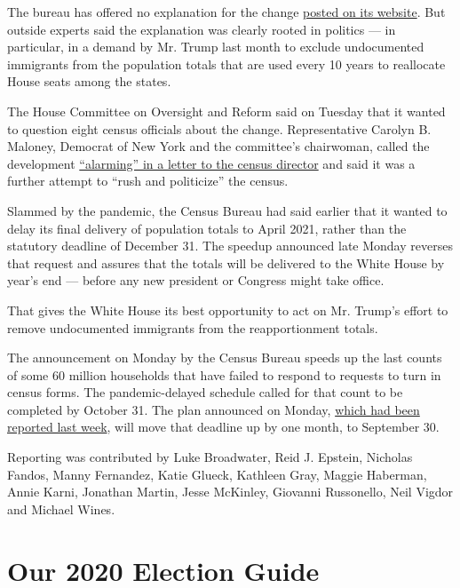The bureau has offered no explanation for the change
\href{https://www.census.gov/newsroom/press-releases/2020/delivering-complete-accurate-count.html}{posted
on its website}. But outside experts said the explanation was clearly
rooted in politics --- in particular, in a demand by Mr. Trump last
month to exclude undocumented immigrants from the population totals that
are used every 10 years to reallocate House seats among the states.

The House Committee on Oversight and Reform said on Tuesday that it
wanted to question eight census officials about the change.
Representative Carolyn B. Maloney, Democrat of New York and the
committee's chairwoman, called the development
\href{https://oversight.house.gov/sites/democrats.oversight.house.gov/files/2020-08-04.CBM\%20to\%20Dillingham\%20re\%20Transcribed\%20Interviews.pdf}{``alarming''
in a letter to the census director} and said it was a further attempt to
``rush and politicize'' the census.

Slammed by the pandemic, the Census Bureau had said earlier that it
wanted to delay its final delivery of population totals to April 2021,
rather than the statutory deadline of December 31. The speedup announced
late Monday reverses that request and assures that the totals will be
delivered to the White House by year's end --- before any new president
or Congress might take office.

That gives the White House its best opportunity to act on Mr. Trump's
effort to remove undocumented immigrants from the reapportionment
totals.

The announcement on Monday by the Census Bureau speeds up the last
counts of some 60 million households that have failed to respond to
requests to turn in census forms. The pandemic-delayed schedule called
for that count to be completed by October 31. The plan announced on
Monday,
\href{https://www.nytimes3xbfgragh.onion/2020/07/28/us/trump-census.html}{which
had been reported last week}, will move that deadline up by one month,
to September 30.

Reporting was contributed by Luke Broadwater, Reid J. Epstein, Nicholas
Fandos, Manny Fernandez, Katie Glueck, Kathleen Gray, Maggie Haberman,
Annie Karni, Jonathan Martin, Jesse McKinley, Giovanni Russonello, Neil
Vigdor and Michael Wines.

\hypertarget{our-2020-election-guide}{%
\section{Our 2020 Election Guide}\label{our-2020-election-guide}}

